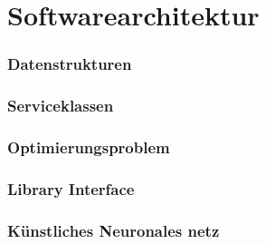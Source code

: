\section{Softwarearchitektur}
\subsubsection{Datenstrukturen}
\subsubsection{Serviceklassen}
\subsubsection{Optimierungsproblem}
\subsubsection{Library Interface}
\subsubsection{Künstliches Neuronales netz}